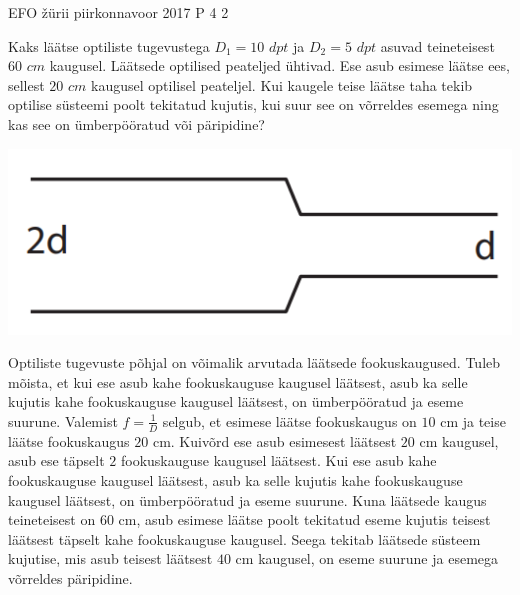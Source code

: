{EFO žürii} %
{piirkonnavoor} %
{2017} %
{P 4} %
{2} %
{
\ifStatement
Kaks läätse optiliste tugevustega $D_1 = 10$ $dpt$ ja $D_2 = 5$ $dpt$ asuvad teineteisest $60$ $cm$ kaugusel. Läätsede optilised peateljed ühtivad. Ese asub esimese läätse ees, sellest $20$ $cm$ kaugusel optilisel peateljel. Kui kaugele teise läätse taha tekib optilise süsteemi poolt tekitatud kujutis, kui suur see on võrreldes esemega ning kas see on ümberpööratud või päripidine? 
\begin{center}
	\includegraphics[width=0.5\linewidth]{2017-v2p-04-yl.PNG}
\end{center}
\fi
\ifHint
Optiliste tugevuste põhjal on võimalik arvutada läätsede fookuskaugused. Tuleb mõista, et kui ese asub kahe fookuskauguse kaugusel läätsest, asub ka selle kujutis kahe fookuskauguse kaugusel läätsest, on ümberpööratud ja eseme suurune.
\fi
\ifSolution
Valemist $f = \frac{1}{D}$ selgub, et esimese läätse fookuskaugus on $10$ cm ja teise läätse fookuskaugus $20$ cm. Kuivõrd ese asub esimesest läätsest $20$ cm kaugusel, asub ese täpselt $2$ fookuskauguse kaugusel läätsest. Kui ese asub kahe fookuskauguse kaugusel läätsest, asub ka selle kujutis kahe fookuskauguse kaugusel läätsest, on ümberpööratud ja eseme suurune. Kuna läätsede kaugus teineteisest on $60$ cm, asub esimese läätse poolt tekitatud eseme kujutis teisest läätsest täpselt kahe fookuskauguse kaugusel. Seega tekitab läätsede süsteem kujutise, mis asub teisest läätsest $40$ cm kaugusel, on eseme suurune ja esemega võrreldes päripidine.
\fi
}
